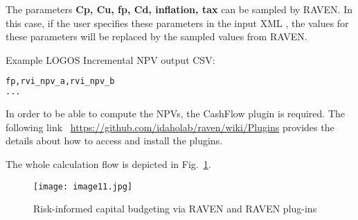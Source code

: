 The parameters \textbf{Cp, Cu, fp, Cd, inflation, tax} can be sampled by RAVEN. In
this case, if the user specifies these parameters in the input XML ,
the values for these parameters will be replaced by the sampled values from RAVEN.

Example LOGOS Incremental NPV output CSV:
\begin{lstlisting}[language=python]
fp,rvi_npv_a,rvi_npv_b
...
\end{lstlisting}

\nb In order to be able to compute the NPVs, the CashFlow plugin is required.
The following link ~\url{https://github.com/idaholab/raven/wiki/Plugins} provides
the details about how to access and install the plugins.

The whole calculation flow is depicted in Fig.~\ref{fig:LogosRAVEN}.


\begin{figure}
    \centering
    \centerline{\texttt{[image: image11.jpg]}}
    \caption{Risk-informed capital budgeting via RAVEN and RAVEN plug-ins}
    \label{fig:LogosRAVEN}
\end{figure}

